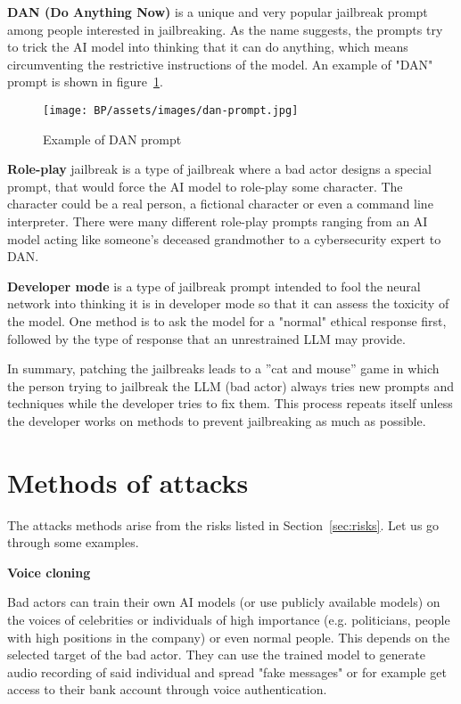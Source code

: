 \textbf{DAN (Do Anything Now)} is a unique and very popular jailbreak prompt among people interested in jailbreaking. As the name suggests, the prompts try to trick the AI model into thinking that it can do anything, which means circumventing the restrictive instructions of the model. An example of "DAN" prompt is shown in figure~\ref{fig:dan-prompt}.

\begin{figure}[ht]
\begin{centering}
\texttt{[image: BP/assets/images/dan-prompt.jpg]}
\par\end{centering}
\caption{Example of 
 DAN prompt\cite{reddit_pic}
 \label{fig:dan-prompt}}
\end{figure}


\textbf{Role-play} jailbreak is a type of jailbreak where a bad actor designs a special prompt, that would force the AI model to role-play some character. The character could be a real person, a fictional character or even a command line interpreter. There were many different role-play prompts ranging from an AI model acting like someone's deceased grandmother to a cybersecurity expert to DAN.

\textbf{Developer mode} is a type of jailbreak prompt intended to fool the neural network into thinking it is in developer mode so that it can assess the toxicity of the model. One method is to ask the model for a "normal" ethical response first, followed by the type of response that an unrestrained LLM may provide.

In summary, patching the jailbreaks leads to a ''cat and mouse'' game in which the person trying to jailbreak the LLM (bad actor) always tries new prompts and techniques while the developer tries to fix them. This process repeats itself unless the developer works on methods to prevent jailbreaking as much as possible.

\section{Methods of attacks}
The attacks methods arise from the risks listed in Section~\ref{sec:risks}. Let us go through some examples.

\textbf{Voice cloning}

Bad actors can train their own AI models (or use publicly available models) on the voices of celebrities or individuals of high importance (e.g. politicians, people with high positions in the company) or even normal people. This depends on the selected target of the bad actor. They can use the trained model to generate audio recording of said individual and spread "fake messages" or for example get access to their bank account through voice authentication.

